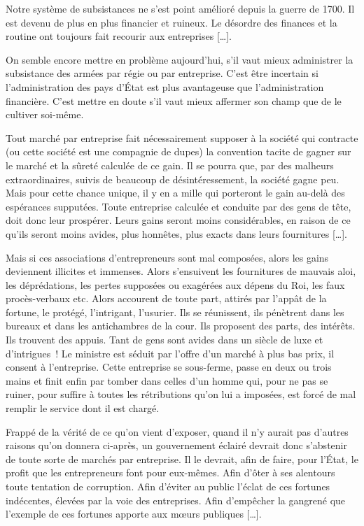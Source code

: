 \documentclass[french,twoside]{book} %
\begin{document}
Notre système de subsistances ne s’est point amélioré depuis la guerre de 1700. Il est devenu de plus en plus financier et ruineux. Le désordre des finances et la routine ont toujours fait recourir aux entreprises […].\par
On semble encore mettre en problème aujourd’hui, s’il vaut mieux administrer la subsistance des armées par régie ou par entreprise. C’est être incertain si l’administration des pays d’État est plus avantageuse que l’administration financière. C’est mettre en doute s’il vaut mieux affermer son champ que de le cultiver soi-même.\par
Tout marché par entreprise fait nécessairement supposer à la société qui contracte (ou cette société est une compagnie de dupes) la convention tacite de gagner sur le marché et la sûreté calculée de ce gain. Il se pourra que, par des malheurs extraordinaires, suivis de beaucoup de désintéressement, la société gagne peu. Mais pour cette chance unique, il y en a mille qui porteront le gain au-delà des espérances supputées. Toute entreprise calculée et conduite par des gens de tête, doit donc leur prospérer. Leurs gains seront moins considérables, en raison de ce qu’ils seront moins avides, plus honnêtes, plus exacts dans leurs fournitures […].\par
Mais si ces associations d’entrepreneurs sont mal composées, alors les gains deviennent illicites et immenses. Alors s’ensuivent les fournitures de mauvais aloi, les déprédations, les pertes supposées ou exagérées aux dépens du Roi, les faux procès-verbaux etc. Alors accourent de toute part, attirés par l’appât de la fortune, le protégé, l’intrigant, l’usurier. Ils se réunissent, ils pénètrent dans les bureaux et dans les antichambres de la cour. Ils proposent des parts, des intérêts. Ils trouvent des appuis. Tant de gens sont avides dans un siècle de luxe et d’intrigues ! Le ministre est séduit par l’offre d’un marché à plus bas prix, il consent à l’entreprise. Cette entreprise se sous-ferme, passe en deux ou trois mains et finit enfin par tomber dans celles d’un homme qui, pour ne pas se ruiner, pour suffire à toutes les rétributions qu’on lui a imposées, est forcé de mal remplir le service dont il est chargé.\par
Frappé de la vérité de ce qu’on vient d’exposer, quand il n’y aurait pas d’autres raisons qu’on donnera ci-après, un gouvernement éclairé devrait donc s’abstenir de toute sorte de marchés par entreprise. Il le devrait, afin de faire, pour l’État, le profit que les entrepreneurs font pour eux-mêmes. Afin d’ôter à ses alentours toute tentation de corruption. Afin d’éviter au public l’éclat de ces fortunes indécentes, élevées par la voie des entreprises. Afin d’empêcher la gangrené que l’exemple de ces fortunes apporte aux mœurs publiques […].\par
\end{document}
